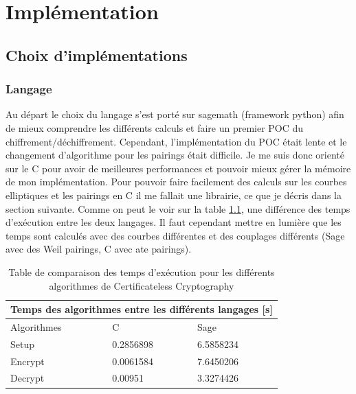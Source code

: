 \chapter{Implémentation}
\label{ch:impl}

\section{Choix d'implémentations}
\subsection{Langage}
Au départ le choix du langage s'est porté sur sagemath (framework python) afin de mieux comprendre les différents calculs et faire un premier POC du chiffrement/déchiffrement.
Cependant, l'implémentation du POC était lente et le changement d'algorithme pour les pairings était difficile.
Je me suis donc orienté sur le C pour avoir de meilleures performances et pouvoir mieux gérer la mémoire de mon implémentation. Pour pouvoir faire facilement des calculs sur les courbes elliptiques et les pairings en C il me fallait une librairie, ce que je décris dans la section suivante. Comme on peut le voir sur la table \ref{table:comparisonTimeAlgo}, une différence des temps d'exécution entre les deux langages. Il faut cependant mettre en lumière que les temps sont calculés avec des courbes différentes et des couplages différents (Sage avec des Weil pairings, C avec ate pairings).

\begin{table}[h!]
	\centering
	\begin{tabular}{ |p{3cm}||p{3cm}|p{3cm}| }
		\hline
		\multicolumn{3}{|c|}{Temps des algorithmes entre les différents langages [s]} \\
		\hline
		Algorithmes & C & Sage\\
		\hline
		Setup   & 0.2856898 & 6.5858234\\
		Encrypt & 0.0061584 & 7.6450206\\
		Decrypt & 0.00951 & 3.3274426\\
		\hline
	\end{tabular}
\caption{Table de comparaison des temps d'exécution pour les différents algorithmes de Certificateless Cryptography }
\label{table:comparisonTimeAlgo}
\end{table}

